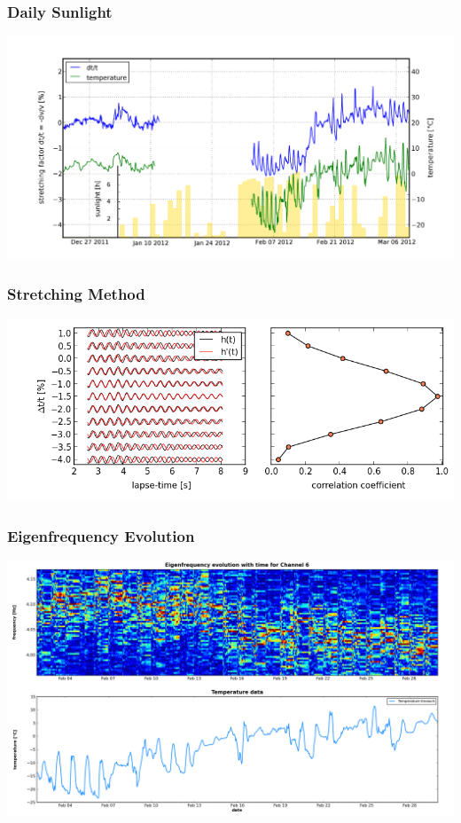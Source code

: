 \documentclass[compress=false,usepdftitle=false, subsection=false,xcolor=dvipsnames]{beamer}
\begin{document}
\begin{frame}
	\frametitle{Daily Sunlight}
	\begin{center}
		\includegraphics[width=\linewidth]{Figures/whole3.png}
    \end{center}
\end{frame}

\begin{frame}
	\frametitle{Stretching Method}
	\begin{center}
		\includegraphics[width=\linewidth]{Figures/stretchingMethod.png}
    \end{center}
\end{frame}

\begin{frame}
	\frametitle{Eigenfrequency Evolution}
	\begin{center}
		\includegraphics[width=\linewidth]{Figures/eigenfreq_evolution.png}
    \end{center}
\end{frame}
\end{document}
